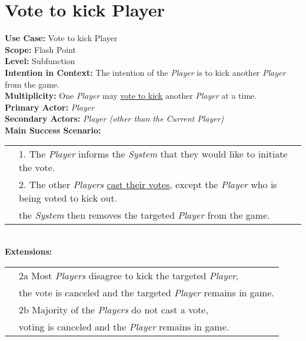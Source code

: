 \documentclass{article}
\begin{document}
	\section*{Vote to kick Player}
	\textbf{Use Case:} Vote to kick Player\\
	\textbf{Scope:} Flash Point\\
	\textbf{Level:} Subfunction\\
	\textbf{Intention in Context:} The intention of the \textit{Player} is to kick another \textit{Player} from the game.\\
	\textbf{Multiplicity: } One \textit{Player} may \underline{vote to kick} another \textit{Player} at a time.\\
	\textbf{Primary Actor:} \textit{Player}\\
	\textbf{Secondary Actors:} \textit{Player (other than the Current Player)}\\
	\textbf{Main Success Scenario:}\\
	\begin{tabular}{l l}
		&1. The \textit{Player} informs the \textit{System} that they would like to initiate the vote.\\
		&2. The other \textit{Players} \underline{cast their votes}, except the \textit{Player} who is being voted to kick out.\\
		&\qquad the \textit{System} then removes the targeted \textit{Player} from the game.
	\end{tabular}\\
	\textbf{Extensions: }\\
	\begin{tabular}{l l}
		&2a Most \textit{Players} disagree to kick the targeted \textit{Player},\\
		&\qquad the vote is canceled and the targeted \textit{Player} remains in game.\\
		&2b Majority of the \textit{Players} do not cast a vote,\\
		&\qquad voting is canceled and the \textit{Player} remains in game.
	\end{tabular}
\end{document}
